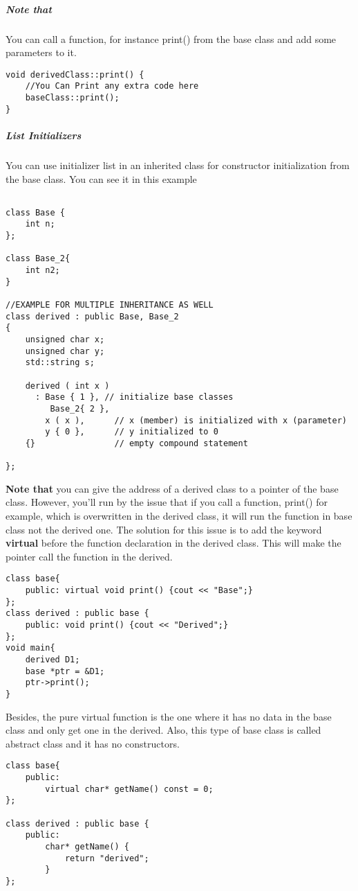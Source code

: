 \documentclass{article}
\begin{document}
\subparagraph{Note that}

You can call a function, for instance print() from the base class and add some parameters to it.

\begin{lstlisting}
void derivedClass::print() {
	//You Can Print any extra code here
	baseClass::print();
}
\end{lstlisting}

\subparagraph{List Initializers}

You can use initializer list in an inherited class for constructor initialization from the base class. You can see it in this example

\begin{lstlisting}

class Base {
    int n;
};   

class Base_2{
	int n2;
}

//EXAMPLE FOR MULTIPLE INHERITANCE AS WELL
class derived : public Base, Base_2
{
    unsigned char x;
    unsigned char y;
    std::string s;
 
    derived ( int x )
      : Base { 1 }, // initialize base classes
		 Base_2{ 2 },
        x ( x ),      // x (member) is initialized with x (parameter)
        y { 0 },      // y initialized to 0
    {}                // empty compound statement
 
};
\end{lstlisting}
\newpage

\textbf{Note that} you can give the address of a derived class to a pointer of the base class.
However, you'll run by the issue that if you call a function, print() for example, which is overwritten in the derived class, it will run the function in base class not the derived one.
The solution for this issue is to add the keyword \textbf{virtual} before the function declaration in the derived class. This will make the pointer call the function in the derived. 

\begin{lstlisting}
class base{
	public: virtual void print() {cout << "Base";}
};
class derived : public base {
	public:	void print() {cout << "Derived";}
};
void main{
	derived D1;
	base *ptr = &D1;
	ptr->print();
}
\end{lstlisting}

Besides, the pure virtual function is the one where it has no data in the base class and only get one in the derived. Also, this type of base class is called abstract class and it has no constructors.

\begin{lstlisting}
class base{
	public:
		virtual char* getName() const = 0;
};

class derived : public base {
	public:
		char* getName() {
			return "derived";	
		}
};
\end{lstlisting}
\end{document}
